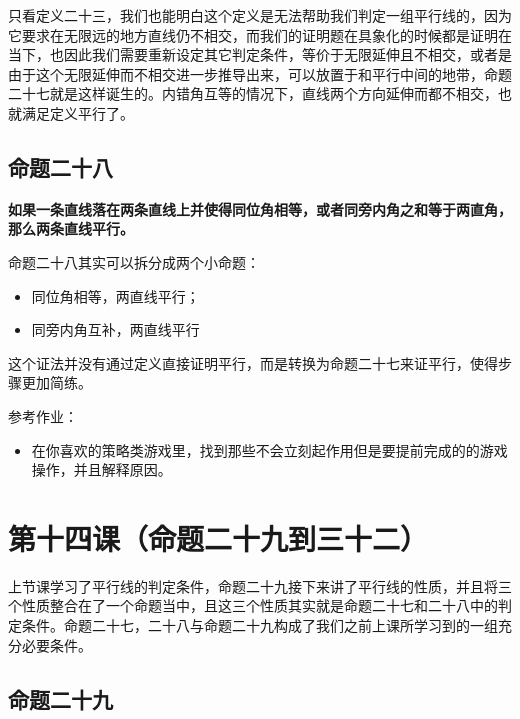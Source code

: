 \documentclass[
]{book}
\providecommand{\tightlist}{%
  \setlength{\itemsep}{0pt}\setlength{\parskip}{0pt}}
\begin{document}
只看定义二十三，我们也能明白这个定义是无法帮助我们判定一组平行线的，因为它要求在无限远的地方直线仍不相交，而我们的证明题在具象化的时候都是证明在当下，也因此我们需要重新设定其它判定条件，等价于无限延伸且不相交，或者是由于这个无限延伸而不相交进一步推导出来，可以放置于和平行中间的地带，命题二十七就是这样诞生的。内错角互等的情况下，直线两个方向延伸而都不相交，也就满足定义平行了。

\hypertarget{ux547dux9898ux4e8cux5341ux516b}{%
\section{命题二十八}\label{ux547dux9898ux4e8cux5341ux516b}}

\textbf{如果一条直线落在两条直线上并使得同位角相等，或者同旁内角之和等于两直角，那么两条直线平行。}

命题二十八其实可以拆分成两个小命题：

\begin{itemize}
\tightlist
\item
  同位角相等，两直线平行；
\item
  同旁内角互补，两直线平行
\end{itemize}

这个证法并没有通过定义直接证明平行，而是转换为命题二十七来证平行，使得步骤更加简练。

参考作业：

\begin{itemize}
\tightlist
\item
  在你喜欢的策略类游戏里，找到那些不会立刻起作用但是要提前完成的的游戏操作，并且解释原因。
\end{itemize}

\hypertarget{ux7b2cux5341ux56dbux8bfeux547dux9898ux4e8cux5341ux4e5dux5230ux4e09ux5341ux4e8c}{%
\chapter{第十四课（命题二十九到三十二）}\label{ux7b2cux5341ux56dbux8bfeux547dux9898ux4e8cux5341ux4e5dux5230ux4e09ux5341ux4e8c}}

上节课学习了平行线的判定条件，命题二十九接下来讲了平行线的性质，并且将三个性质整合在了一个命题当中，且这三个性质其实就是命题二十七和二十八中的判定条件。命题二十七，二十八与命题二十九构成了我们之前上课所学习到的一组充分必要条件。

\hypertarget{ux547dux9898ux4e8cux5341ux4e5d}{%
\section{命题二十九}\label{ux547dux9898ux4e8cux5341ux4e5d}}
\end{document}
